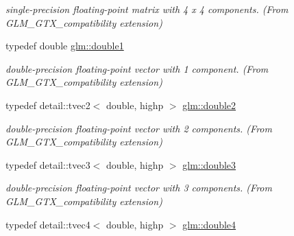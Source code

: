 \begin{CompactItemize}
\begin{CompactList}\small\item\em single-precision floating-point matrix with 4 x 4 components. (From GLM\_\-GTX\_\-compatibility extension) \item\end{CompactList}\item 
\hypertarget{group__gtx__compatibility_gb8b88350212cea916857cb2f49b8a29f}{
typedef double \hyperlink{group__gtx__compatibility_gb8b88350212cea916857cb2f49b8a29f}{glm::double1}}
\label{group__gtx__compatibility_gb8b88350212cea916857cb2f49b8a29f}

\begin{CompactList}\small\item\em double-precision floating-point vector with 1 component. (From GLM\_\-GTX\_\-compatibility extension) \item\end{CompactList}\item 
\hypertarget{group__gtx__compatibility_g227d30a4fa630c9e3fb6c7ea87250c62}{
typedef detail::tvec2$<$ double, highp $>$ \hyperlink{group__gtx__compatibility_g227d30a4fa630c9e3fb6c7ea87250c62}{glm::double2}}
\label{group__gtx__compatibility_g227d30a4fa630c9e3fb6c7ea87250c62}

\begin{CompactList}\small\item\em double-precision floating-point vector with 2 components. (From GLM\_\-GTX\_\-compatibility extension) \item\end{CompactList}\item 
\hypertarget{group__gtx__compatibility_g3b94d4a19ca0272cad6e025fc5150d06}{
typedef detail::tvec3$<$ double, highp $>$ \hyperlink{group__gtx__compatibility_g3b94d4a19ca0272cad6e025fc5150d06}{glm::double3}}
\label{group__gtx__compatibility_g3b94d4a19ca0272cad6e025fc5150d06}

\begin{CompactList}\small\item\em double-precision floating-point vector with 3 components. (From GLM\_\-GTX\_\-compatibility extension) \item\end{CompactList}\item 
\hypertarget{group__gtx__compatibility_g1edf736b418528a2fc87d826f7697b9d}{
typedef detail::tvec4$<$ double, highp $>$ \hyperlink{group__gtx__compatibility_g1edf736b418528a2fc87d826f7697b9d}{glm::double4}}
\label{group__gtx__compatibility_g1edf736b418528a2fc87d826f7697b9d}


\end{CompactItemize}
